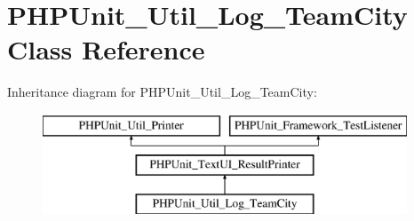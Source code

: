\hypertarget{class_p_h_p_unit___util___log___team_city}{}\section{P\+H\+P\+Unit\+\_\+\+Util\+\_\+\+Log\+\_\+\+Team\+City Class Reference}
\label{class_p_h_p_unit___util___log___team_city}
Inheritance diagram for P\+H\+P\+Unit\+\_\+\+Util\+\_\+\+Log\+\_\+\+Team\+City\+:\begin{figure}[H]
\begin{center}
\leavevmode
\includegraphics[height=3.000000cm]{class_p_h_p_unit___util___log___team_city}
\end{center}
\end{figure}

